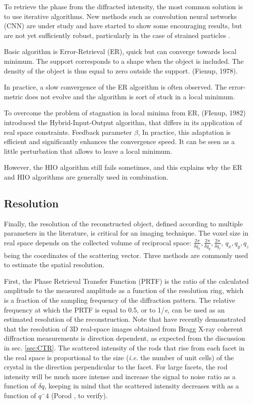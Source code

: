 To retrieve the phase from the diffracted intensity, the most common solution is to use iterative algorithms.
New methods such as convolution neural networks (CNN) are under study and have started to show some encouraging results, but are not yet sufficiently robust, particularly in the case of strained particles \cite{cherukara_real-time_2018,chan_rapid_2021,Wu2021}.


Basic algorithm is Error-Retrieval (ER), quick but can converge towards local minimum.
The support corresponds to a shape when the object is included. The density of the object is thus equal to zero outside the support. (Fienup, 1978).

In practice, a slow convergence of the ER algorithm is often observed. The error-metric does not evolve and the algorithm is sort of stuck in a local minimum.

To overcome the problem of stagnation in local minima from ER, (FIenup, 1982) introduced the Hybrid-Input-Output algorithm, that differs in its application of real space constraints. Feedback parameter $\beta$,
In practice, this adaptation is efficient and significantly enhances the convergence speed. It can be seen as a little perturbation that allows to leave a local minimum.

However, the HIO algorithm still fails sometimes, and this explains why the ER and HIO algorithms are generally used in combination.

\subsection{Resolution}

Finally, the resolution of the reconstructed object, defined according to multiple parameters in the literature, is critical for an imaging technique.
The voxel size in real space depends on the collected volume of reciprocal space: $\frac{2\pi}{\delta q_x}, \frac{2\pi}{\delta q_y}, \frac{2\pi}{\delta q_z}$, $q_x, q_y, q_z$ being the coordinates of the scattering vector.
Three methods are commonly used to estimate the spatial resolution.

First, the Phase Retrieval Transfer Function (PRTF) \parencite{chapman_high-resolution_2006} is the ratio of the calculated amplitude to the measured amplitude as a function of the resolution ring, which is a fraction of the sampling frequency of the diffraction pattern. The relative frequency at which the PRTF is equal to 0.5, or to 1/\textit{e}, can be used as an estimated resolution of the reconstruction.
Note that \cite{cherukara_anisotropic_2018} have recently demonstrated that the resolution of 3D real-space images obtained from Bragg X-ray coherent diffraction measurements is direction dependent, as expected from the discussion in sec. \ref{sec:CTR}.
The scattered intensity of the rods that rise from each facet in the real space is proportional to the size (\textit{i.e.} the number of unit cells) of the crystal in the direction perpendicular to the facet.
For large facets, the rod intensity will be much more intense and increase the signal to noise ratio as a function of $\delta q$, keeping in mind that the scattered intensity decreases with as a function of $q^-4$ (Porod \parencite{NielsenMcMorrow, Willmott}, to verify).

